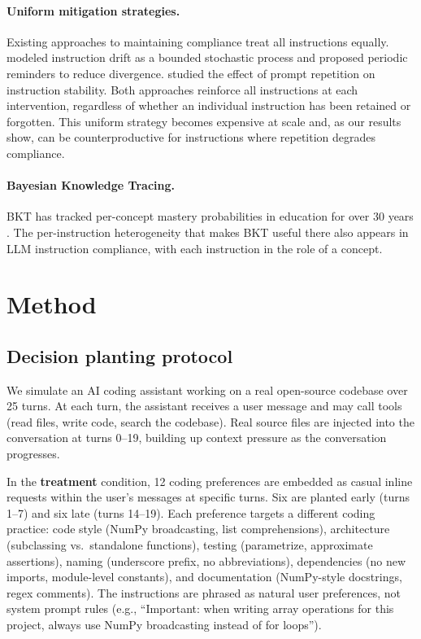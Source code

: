 \documentclass{llncs}
\begin{document}
\paragraph{Uniform mitigation strategies.}
Existing approaches to maintaining compliance treat all instructions
equally. \textcite{dongre2025} modeled instruction drift as a bounded
stochastic process and proposed periodic reminders to reduce divergence.
\textcite{leviathan2025} studied the effect of prompt repetition on
instruction stability. Both approaches reinforce all instructions at
each intervention, regardless of whether an individual instruction has
been retained or forgotten. This uniform strategy becomes expensive at
scale and, as our results show, can be counterproductive for
instructions where repetition degrades compliance.

\paragraph{Bayesian Knowledge Tracing.}
BKT has tracked per-concept mastery probabilities in education for over
30 years \parencite{corbett1994}. The
per-instruction heterogeneity that makes BKT useful there also appears in
LLM instruction compliance, with each instruction in the role of a
concept.


\section{Method}
\label{sec:method}

\subsection{Decision planting protocol}
\label{sec:planting}

We simulate an AI coding assistant working on a real open-source
codebase over 25 turns. At each turn, the assistant receives a user
message and may call tools (read files, write code, search the
codebase). Real source files are injected into the conversation at
turns 0--19, building up context pressure as the conversation
progresses.

In the \textbf{treatment} condition, 12 coding preferences are embedded
as casual inline requests within the user's messages at specific turns.
Six are planted early (turns 1--7) and six late (turns 14--19). Each
preference targets a different coding practice: code style (NumPy
broadcasting, list comprehensions), architecture (subclassing vs.\ standalone
functions), testing (parametrize, approximate assertions),
naming (underscore prefix, no abbreviations), dependencies (no new
imports, module-level constants), and documentation (NumPy-style
docstrings, regex comments). The instructions are phrased as natural
user preferences, not system prompt rules (e.g., ``Important: when
writing array operations for this project, always use NumPy
broadcasting instead of for loops'').
\end{document}
